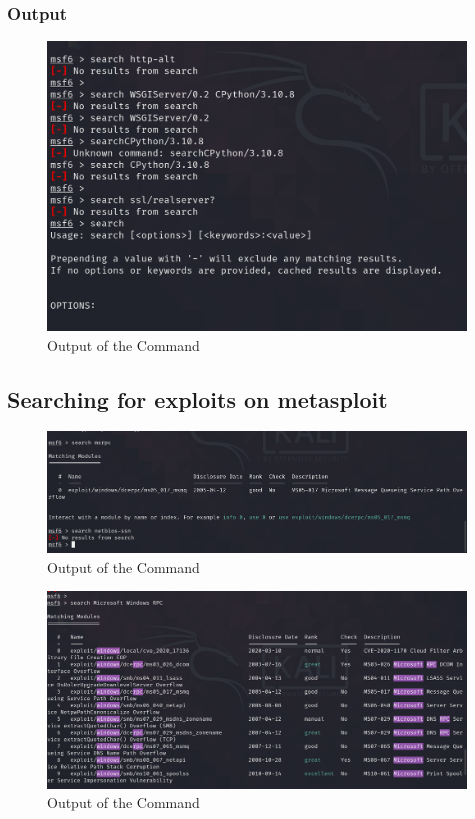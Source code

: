 \documentclass[11pt]{article}
\begin{document}
\subsubsection*{Output}
\begin{figure}[H]
    \centering
    \includegraphics[width=0.99\textwidth]{a3_ss (17).png}
    \caption{Output of the Command}
\end{figure}
\subsection{Searching for exploits on metasploit}

\begin{figure}[H]
    \centering
    \includegraphics[width=0.99\textwidth]{a3_ss (18).png}
    \caption{Output of the Command}
\end{figure}

\begin{figure}[H]
    \centering
    \includegraphics[width=0.99\textwidth]{a3_ss (19).png}
    \caption{Output of the Command}
\end{figure}
\end{document}
